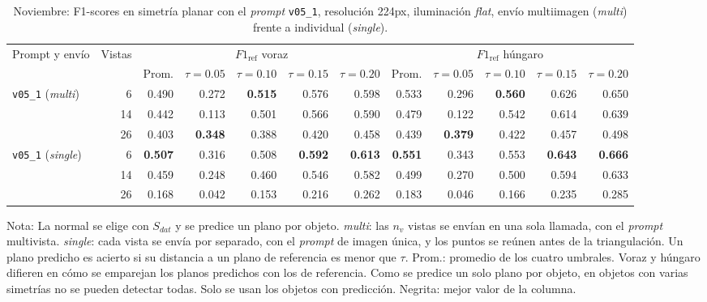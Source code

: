 \clearpage

\begin{table}[htbp]
\centering
\caption{Noviembre: F1-scores en simetría planar con el \textit{prompt} \texttt{v05\_1}, resolución 224px, iluminación \textit{flat}, envío multiimagen (\textit{multi}) frente a individual (\textit{single}).}
\label{tab:nov_plane_modo_envio_f1}
\begin{lrbox}{\tablebox}
\begin{adjustbox}{max width=\textwidth}
\begin{tabular}{lrrrrrrrrrrr}
\toprule
\multirow{2}{*}{Prompt y envío} & \multirow{2}{*}{Vistas} & \multicolumn{5}{c}{$F1_{\mathrm{ref}}$ voraz} & \multicolumn{5}{c}{$F1_{\mathrm{ref}}$ húngaro} \\
\cmidrule(lr){3-7} \cmidrule(lr){8-12}
 &  & Prom. & $\tau{=}0.05$ & $\tau{=}0.10$ & $\tau{=}0.15$ & $\tau{=}0.20$ & Prom. & $\tau{=}0.05$ & $\tau{=}0.10$ & $\tau{=}0.15$ & $\tau{=}0.20$ \\
\midrule
\multirow{3}{*}{\texttt{v05\_1} (\textit{multi})} & 6 & 0.490 & 0.272 & \textbf{0.515} & 0.576 & 0.598 & 0.533 & 0.296 & \textbf{0.560} & 0.626 & 0.650 \\
 & 14 & 0.442 & 0.113 & 0.501 & 0.566 & 0.590 & 0.479 & 0.122 & 0.542 & 0.614 & 0.639 \\
 & 26 & 0.403 & \textbf{0.348} & 0.388 & 0.420 & 0.458 & 0.439 & \textbf{0.379} & 0.422 & 0.457 & 0.498 \\
\midrule
\multirow{3}{*}{\texttt{v05\_1} (\textit{single})} & 6 & \textbf{0.507} & 0.316 & 0.508 & \textbf{0.592} & \textbf{0.613} & \textbf{0.551} & 0.343 & 0.553 & \textbf{0.643} & \textbf{0.666} \\
 & 14 & 0.459 & 0.248 & 0.460 & 0.546 & 0.582 & 0.499 & 0.270 & 0.500 & 0.594 & 0.633 \\
 & 26 & 0.168 & 0.042 & 0.153 & 0.216 & 0.262 & 0.183 & 0.046 & 0.166 & 0.235 & 0.285 \\
\bottomrule
\end{tabular}
\end{adjustbox}
\end{lrbox}
\usebox{\tablebox}

\vspace{1.5ex}
\begin{minipage}{\wd\tablebox}
\footnotesize
Nota: La normal se elige con $S_{dat}$ y se predice un plano por objeto. \textit{multi}: las $n_v$ vistas se envían en una sola llamada, con el \textit{prompt} multivista. \textit{single}: cada vista se envía por separado, con el \textit{prompt} de imagen única, y los puntos se reúnen antes de la triangulación. Un plano predicho es acierto si su distancia a un plano de referencia es menor que $\tau$. Prom.: promedio de los cuatro umbrales. Voraz y húngaro difieren en cómo se emparejan los planos predichos con los de referencia. Como se predice un solo plano por objeto, en objetos con varias simetrías no se pueden detectar todas. Solo se usan los objetos con predicción. Negrita: mejor valor de la columna.
\end{minipage}
\end{table}

